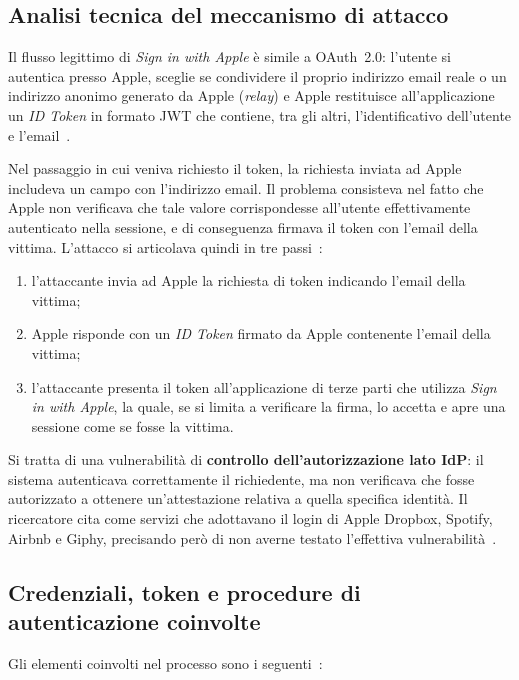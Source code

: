 \subsection{Analisi tecnica del meccanismo di attacco}
Il flusso legittimo di \emph{Sign in with Apple} è simile a OAuth~2.0: l'utente
si autentica presso Apple, sceglie se condividere il proprio indirizzo email
reale o un indirizzo anonimo generato da Apple (\emph{relay}) e Apple restituisce
all'applicazione un \emph{ID Token} in formato JWT che contiene, tra gli altri,
l'identificativo dell'utente e l'email~\cite{apple-authentication,jain-apple-2020}.

Nel passaggio in cui veniva richiesto il token, la richiesta inviata ad Apple
includeva un campo con l'indirizzo email. Il problema consisteva nel fatto che
Apple non verificava che tale valore corrispondesse all'utente effettivamente
autenticato nella sessione, e di conseguenza firmava il token con l'email della vittima.
L'attacco si articolava quindi in tre passi~\cite{jain-apple-2020}:

\begin{enumerate}
    \item l'attaccante invia ad Apple la richiesta di token indicando l'email
    della vittima;
    \item Apple risponde con un \emph{ID Token} firmato da Apple contenente l'email della
    vittima;
    \item l'attaccante presenta il token all'applicazione di terze parti che
    utilizza \emph{Sign in with Apple}, la quale, se si limita a verificare la
    firma, lo accetta e apre una sessione come se fosse la vittima.
\end{enumerate}

Si tratta di una vulnerabilità di \textbf{controllo dell'autorizzazione lato
IdP}: il sistema autenticava correttamente il richiedente, ma non verificava che
fosse autorizzato a ottenere un'attestazione relativa a quella specifica
identità. Il ricercatore cita come servizi che adottavano il login di Apple
Dropbox, Spotify, Airbnb e Giphy, precisando però di non averne testato
l'effettiva vulnerabilità~\cite{jain-apple-2020}.

\subsection{Credenziali, token e procedure di autenticazione coinvolte}
Gli elementi coinvolti nel processo sono i seguenti~\cite{apple-authentication,apple-verifying-user,openid-connect-core}:

